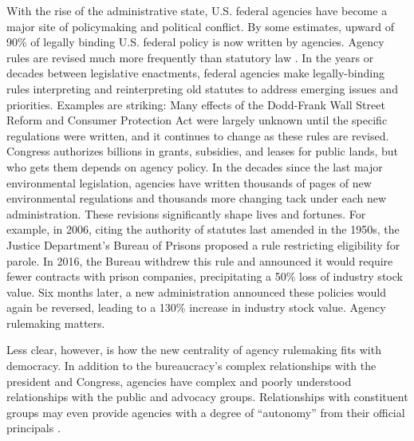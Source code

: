 \documentclass[
      12pt,
        ]{article}
\begin{document}
With the rise of the administrative state, U.S. federal agencies have
become a major site of policymaking and political conflict. By some
estimates, upward of 90\% of legally binding U.S. federal policy is now
written by agencies. Agency rules are revised much more frequently than
statutory law \citep{Wagner2017}. In the years or decades between
legislative enactments, federal agencies make legally-binding rules
interpreting and reinterpreting old statutes to address emerging issues
and priorities. Examples are striking: Many effects of the Dodd-Frank Wall
Street Reform and Consumer Protection Act were largely unknown until the
specific regulations were written, and it continues to change as these
rules are revised. Congress authorizes billions in grants, subsidies, and
leases for public lands, but who gets them depends on agency policy. In
the decades since the last major environmental legislation, agencies
have written thousands of pages of new environmental regulations and
thousands more changing tack under each new administration. These
revisions significantly shape lives and fortunes. For example, in 2006,
citing the authority of statutes last amended in the 1950s, the Justice
Department's Bureau of Prisons proposed a rule restricting eligibility
for parole. In 2016, the Bureau withdrew this rule and announced it
would require fewer contracts with prison companies,
precipitating a 50\% loss of industry stock value. Six months later, a
new administration announced these policies would again be reversed,
leading to a 130\% increase in industry stock value. Agency rulemaking
matters.

Less clear, however, is how the new centrality of agency rulemaking fits
with democracy. In addition to the bureaucracy's complex relationships with
the president and Congress, agencies have complex and poorly understood
relationships with the public and advocacy groups. Relationships with
constituent groups may even provide agencies with a degree of ``autonomy'' from their official principals \citep{Carpenter2001}.
\end{document}
